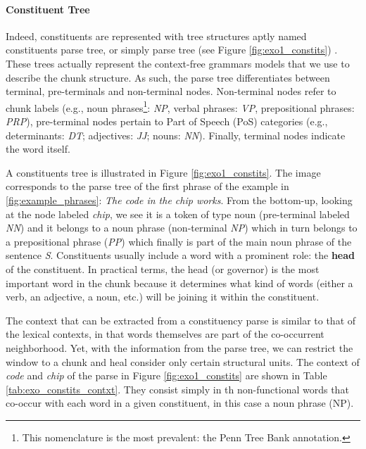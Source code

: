 \paragraph{Constituent Tree}
Indeed, constituents are  represented with tree structures aptly named  constituents parse tree, or simply parse tree (see Figure \ref{fig:exo1_constits}) \cite{JurafskyM09}. These trees actually represent the context-free grammars models that we use to describe the chunk structure. As such, the parse tree differentiates between terminal, pre-terminals and non-terminal nodes. Non-terminal nodes refer to chunk labels (e.g., noun phrases\footnote{This nomenclature is the most prevalent: the Penn Tree Bank annotation.}: \textit{NP}, verbal phrases: \textit{VP}, prepositional phrases: \textit{PRP}), pre-terminal nodes pertain to Part of Speech (PoS) categories (e.g., determinants: \textit{DT}; adjectives: \textit{JJ}; nouns: \textit{NN}). Finally, terminal nodes indicate the word itself. 

A constituents tree is illustrated in Figure \ref{fig:exo1_constits}. The image corresponds to the parse tree of the first phrase of the example in \ref{fig:example_phrases}: \textit{The code in the chip works}. From the bottom-up,  looking at the node labeled \textit{chip}, we see it is a token of type noun (pre-terminal labeled \textit{NN}) and it belongs to a noun phrase (non-terminal \textit{NP}) which in turn belongs to a prepositional phrase (\textit{PP}) which finally is part of the main noun phrase of the sentence \textit{S}. Constituents usually include a word with a prominent role: the \textbf{head} of the constituent. In practical terms, the head (or governor) is the most important word in the chunk because it determines what kind of words (either a verb, an adjective, a noun, etc.) will be joining it within the constituent. 

The context that can be extracted from a constituency parse is similar to that of the lexical contexts, in that words themselves are part of the co-occurrent neighborhood. Yet, with the information from the parse tree, we can restrict the window to a chunk and heal consider only certain structural units. The context of \textit{code} and \textit{chip} of the parse  in Figure \ref{fig:exo1_constits} are shown in Table \ref{tab:exo_constits_contxt}. They consist simply in th non-functional words that co-occur with each word in a given constituent, in this case a noun phrase (NP).

